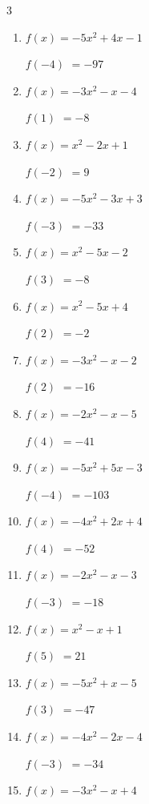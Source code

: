 \begin{multicols}{3}
\begin{enumerate}
$f(4)$
        $= 21$

\columnbreak %

\resetques

  \item $f(x)=-5x^{2}+4x-1$

$f(-4)$
        $= -97$

  \item $f(x)=-3x^{2}-x-4$

$f(1)$
        $= -8$

  \item $f(x)=x^{2}-2x+1$

$f(-2)$
        $= 9$

  \item $f(x)=-5x^{2}-3x+3$

$f(-3)$
        $= -33$

  \item $f(x)=x^{2}-5x-2$

$f(3)$
        $= -8$

  \item $f(x)=x^{2}-5x+4$

$f(2)$
        $= -2$

  \item $f(x)=-3x^{2}-x-2$

$f(2)$
        $= -16$

  \item $f(x)=-2x^{2}-x-5$

$f(4)$
        $= -41$

  \item $f(x)=-5x^{2}+5x-3$

$f(-4)$
        $= -103$

  \item $f(x)=-4x^{2}+2x+4$

$f(4)$
        $= -52$

  \item $f(x)=-2x^{2}-x-3$

$f(-3)$
        $= -18$

  \item $f(x)=x^{2}-x+1$

$f(5)$
        $= 21$

  \item $f(x)=-5x^{2}+x-5$

$f(3)$
        $= -47$

  \item $f(x)=-4x^{2}-2x-4$

$f(-3)$
        $= -34$

  \item $f(x)=-3x^{2}-x+4$


\end{enumerate}
\end{multicols}
